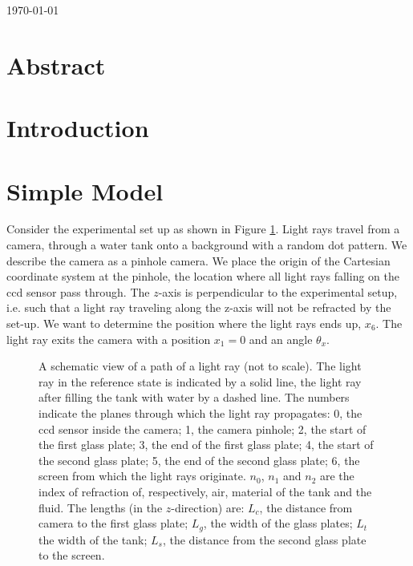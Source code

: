 \documentclass{article}
\begin{document}
\today
\section{Abstract}

\section{Introduction}

\section{Simple Model}
Consider the experimental set up as shown in Figure \ref{fig:schviepalira}. Light rays travel from a camera, through a water tank onto a background with a random dot pattern.  We describe the camera as a pinhole camera. We place the origin of the Cartesian coordinate system at the pinhole, the location where all light rays falling on the ccd sensor pass through. The $z$-axis is perpendicular to the experimental setup, i.e. such that a light ray traveling along the z-axis will not be refracted by the set-up. We want to determine the position where the light rays ends up, $x_6$. The light ray exits the camera with a position $x_1 = 0$ and an angle $\theta_x$. %

%	

\begin{figure}[hpbt]
	
	\caption{A schematic view of a path of a light ray (not to scale). The light ray in the reference state is indicated by a solid line, the light ray after filling the tank with water by a dashed line. The numbers indicate the planes through which the light ray propagates: 0, the ccd sensor inside the camera; 1, the camera pinhole; 2, the start of the first glass plate; 3, the end of the first glass plate; 4, the start of the second glass plate; 5, the end of the second glass plate; 6, the screen from which the light rays originate.  $n_0$, $n_1$ and $n_2$ are the index of refraction of, respectively, air, material of the tank and the fluid. The lengths (in the $z$-direction)  	are: $L_c$, the distance from camera to the first glass plate; $L_g$, the width of the glass plates; $L_t$ the width of the tank; $L_s$, the distance from the second glass plate to the screen.}	
\label{fig:schviepalira}	
\end{figure}
\end{document}
